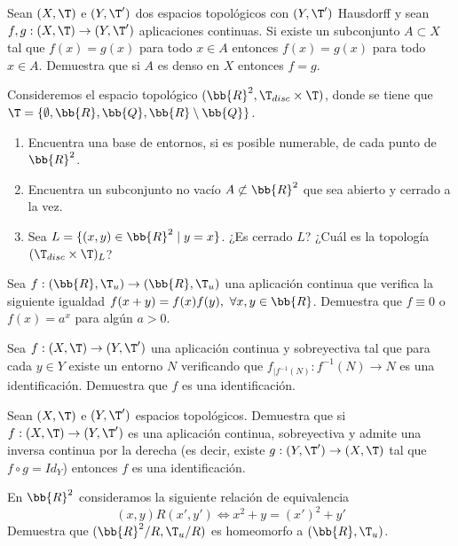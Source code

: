 \begin{ejercicio}
    Sean $(X,\T)$ e $(Y, \T')$ dos espacios topológicos con $(Y, \T')$ Hausdorff y sean $f, g :(X,\T) \to (Y, \T')$ aplicaciones continuas. Si existe un subconjunto $A \subset X$ tal que $f(x) = g(x)$ para todo $x \in A$ entonces $f(x) = g(x)$ para todo $x \in A$. Demuestra que si $A$ es denso en $X$ entonces $f=g$.
\end{ejercicio}

\begin{ejercicio}
    Consideremos el espacio topológico $(\bb{R}^2, \T_{disc} \times \T )$, donde se tiene que $\T = \{\emptyset, \bb{R}, \bb{Q}, \bb{R}\setminus \bb{Q}\}$.
    \begin{enumerate}
        \item Encuentra una base de entornos, si es posible numerable, de cada punto de $\bb{R}^2$.
        \item Encuentra un subconjunto no vacío $A \not \subset \bb{R}^2$ que sea abierto y cerrado a la vez.
        \item Sea $L = \{(x, y) \in \bb{R}^2\mid y = x\}$. ¿Es cerrado $L$? ¿Cuál es la topología $(\T_{disc} \times \T )_L$?
    \end{enumerate}
\end{ejercicio}


\begin{ejercicio}
    Sea $f : (\bb{R}, \T_u) \to (\bb{R}, \T_u)$ una aplicación continua que verifica la siguiente igualdad $f(x + y) = f(x)f(y),~\forall x, y \in \bb{R}$. Demuestra que $f\equiv 0$ o $f(x) = a^x$ para algún $a > 0$.
\end{ejercicio}

\begin{ejercicio}
    Sea $f : (X,\T) \to (Y, \T')$ una aplicación continua y sobreyectiva tal que para cada $y \in Y$ existe un entorno $N$ verificando que $f_{\big|f^{-1}(N)} : f^{-1}(N) \to N$ es una identificación. Demuestra que $f$ es una identificación.
\end{ejercicio}

\begin{ejercicio}
    Sean $(X,\T)$ e $(Y, \T')$ espacios topológicos. Demuestra que si $f : (X,\T) \to (Y, \T')$ es una aplicación continua, sobreyectiva y admite una inversa continua por la derecha (es decir, existe $g : (Y, \T') \to (X,\T)$ tal que $f \circ g = Id_Y$) entonces $f$ es una identificación.
\end{ejercicio}

\begin{ejercicio}
    En $\bb{R}^2$ consideramos la siguiente relación de equivalencia
    \begin{equation*}
        (x, y)R(x', y') \Longleftrightarrow x^2 + y = (x')^2 + y'
    \end{equation*}
    Demuestra que $(\bb{R}^2/R, \T_u/R)$ es homeomorfo a $(\bb{R}, \T_u)$.
\end{ejercicio}

